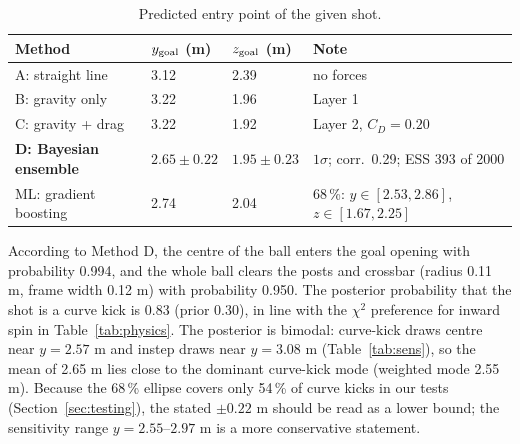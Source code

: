 \documentclass[11pt,a4paper]{article}
\begin{document}
\begin{table}[H]
\centering
\caption{Predicted entry point of the given shot.}
\label{tab:given}
\small
\begin{tabular}{@{}llll@{}}
\toprule
Method & $y_{\rm goal}$ (m) & $z_{\rm goal}$ (m) & Note\\
\midrule
A: straight line & 3.12 & 2.39 & no forces\\
B: gravity only & 3.22 & 1.96 & Layer 1\\
C: gravity + drag & 3.22 & 1.92 & Layer 2, $C_D=0.20$\\
\textbf{D: Bayesian ensemble} & $\mathbf{2.65\pm0.22}$ & $\mathbf{1.95\pm0.23}$ & $1\sigma$; corr.\ 0.29; ESS 393 of 2000\\
ML: gradient boosting & 2.74 & 2.04 & 68\,\%: $y\in[2.53,2.86]$, $z\in[1.67,2.25]$\\
\bottomrule
\end{tabular}
\end{table}
According to Method D, the centre of the ball enters the goal opening with probability 0.994, and the whole ball clears the posts and crossbar (radius 0.11 m, frame width 0.12 m) with probability 0.950. The posterior probability that the shot is a curve kick is 0.83 (prior 0.30), in line with the $\chi^2$ preference for inward spin in Table~\ref{tab:physics}. The posterior is bimodal: curve-kick draws centre near $y=2.57$ m and instep draws near $y=3.08$ m (Table~\ref{tab:sens}), so the mean of 2.65 m lies close to the dominant curve-kick mode (weighted mode 2.55 m). Because the 68\,\% ellipse covers only 54\,\% of curve kicks in our tests (Section~\ref{sec:testing}), the stated $\pm0.22$ m should be read as a lower bound; the sensitivity range $y=2.55$--$2.97$ m is a more conservative statement.
\end{document}
